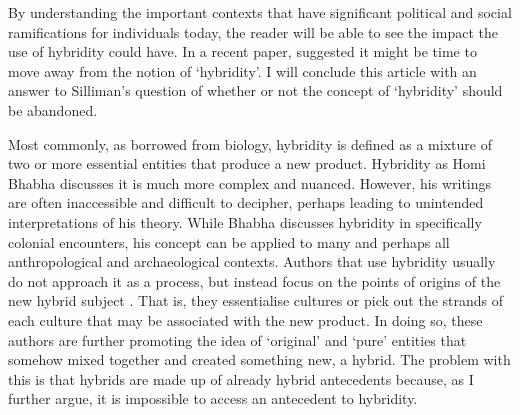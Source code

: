 	By understanding the important contexts that have significant political and social ramifications for individuals today, the reader will be able to see the impact the use of hybridity could have. In a recent paper, \textcite {Silliman_2014}  suggested it might be time to move away from the notion of ‘hybridity’. I will conclude this article with an answer to Silliman’s question of whether or not the concept of ‘hybridity’ should be abandoned. 
	
	
	Most commonly, as borrowed from biology, hybridity is defined as a mixture of two or more essential entities that produce a new product. Hybridity as Homi Bhabha discusses it is much more complex and nuanced. However, his writings are often inaccessible and difficult to decipher, perhaps leading to unintended interpretations of his theory. While Bhabha discusses hybridity in specifically colonial encounters, his concept can be applied to many and perhaps all anthropological and archaeological contexts. Authors that use hybridity usually do not approach it as a process, but instead focus on the points of origins of the new hybrid subject \parencite[267] {Deagan_2013}. That is, they essentialise cultures or pick out the strands of each culture that may be associated with the new product. In doing so, these authors are further promoting the idea of ‘original’ and ‘pure’ entities that somehow mixed together and created something new, a hybrid. The problem with this is that hybrids are made up of already hybrid antecedents because, as I further argue, it is impossible to access an antecedent to hybridity. 
	

